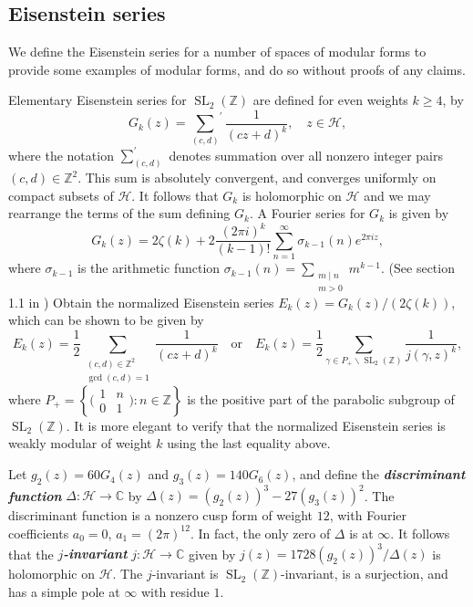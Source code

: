 \documentclass[10pt,leqno,twoside]{article}
\theoremstyle{plain}
\theoremstyle{definition}
\numberwithin{equation}{section}
\numberwithin{lem}{section}
\newcommand{\cbr}[1]{\left\{#1\right\}}
\newcommand{\textib}[1]{\textbf{\textit{#1\index{#1}}}} %
\DeclareMathOperator{\SL}{SL}
\newcommand{\slz}{\SL_2(\mathbb{Z})}
\begin{document}
\subsection{Eisenstein series}
We define the Eisenstein series for a number of spaces of modular forms to provide some examples of modular forms, and do so without proofs of any claims.

Elementary Eisenstein series for $\slz$ are defined for even weights $k\geq 4$, by \[G_k(z) = {\sum_{(c,d)}}^\prime \frac{1}{(cz+d)^k},\quad z\in\mathcal H,\] where the notation $\sum_{(c,d)}^\prime$ denotes summation over all nonzero integer pairs $(c,d)\in\mathbb Z^2$. This sum is absolutely convergent, and converges uniformly on compact subsets of $\mathcal H$. It follows that $G_k$ is holomorphic on $\mathcal H$ and we may rearrange the terms of the sum defining $G_k$. A Fourier series for $G_k$ is given by \[G_k(z) = 2\zeta(k) + 2\frac{(2\pi i)^k}{(k-1)!}\sum_{n=1}^\infty \sigma_{k-1}(n)e^{2\pi i z},\] where $\sigma_{k-1}$ is the arithmetic function $\sigma_{k-1}(n) = \sum_{\substack{m\mid n\\ m>0}}m^{k-1}$. (See section 1.1 in \cite{diamond}) Obtain the normalized Eisenstein series $E_k(z) = G_k(z)/(2\zeta(k))$, which can be shown to be given by 
\[E_k(z) = \frac{1}{2}\sum_{\substack{(c,d)\in\mathbb Z^2\\\gcd(c,d) = 1}}\frac{1}{(cz+d)^k}\quad \text{or} \quad E_k(z) = \frac{1}{2}\sum_{\gamma\in P_+\backslash \slz}\frac{1}{j(\gamma,z)^k},\] where $P_+ = \cbr{\big(\!\begin{smallmatrix}
    1 & n \\ 0 & 1
\end{smallmatrix}\!\big) : n\in\mathbb Z}$ is the positive part of the parabolic subgroup of $\slz$. It is more elegant to verify that the normalized Eisenstein series is weakly modular of weight $k$ using the last equality above. 

Let $g_2(z) = 60 G_4(z)$ and $g_3(z) = 140G_6(z)$, and define the \textib{discriminant function} $\varDelta\colon\mathcal H\to\mathbb C$ by $\varDelta(z) = (g_2(z))^3-27(g_3(z))^2$. The discriminant function is a nonzero cusp form of weight $12$, with Fourier coefficients $a_0 = 0$, $a_1 = (2\pi)^{12}$. In fact, the only zero of $\varDelta$ is at $\infty$. It follows that the \textib{$j$-invariant} $j\colon \mathcal H\to\mathbb C$ given by $j(z) = 1728(g_2(z))^3/\varDelta(z)$ is holomorphic on $\mathcal H$. The $j$-invariant is $\slz$-invariant, is a surjection, and has a simple pole at $\infty$ with residue $1$.
\end{document}
